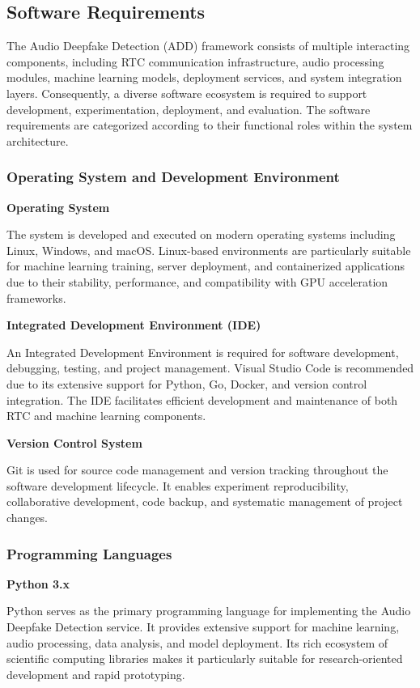 
\subsection{Software Requirements}

The Audio Deepfake Detection (ADD) framework consists of multiple interacting components, including RTC communication infrastructure, audio processing modules, machine learning models, deployment services, and system integration layers. Consequently, a diverse software ecosystem is required to support development, experimentation, deployment, and evaluation. The software requirements are categorized according to their functional roles within the system architecture.

\subsubsection{Operating System and Development Environment}
\vspace{0.5cm}
\textbf{Operating System}

The system is developed and executed on modern operating systems including Linux, Windows, and macOS. Linux-based environments are particularly suitable for machine learning training, server deployment, and containerized applications due to their stability, performance, and compatibility with GPU acceleration frameworks.

\textbf{Integrated Development Environment (IDE)}

An Integrated Development Environment is required for software development, debugging, testing, and project management. Visual Studio Code is recommended due to its extensive support for Python, Go, Docker, and version control integration. The IDE facilitates efficient development and maintenance of both RTC and machine learning components.

\textbf{Version Control System}

Git is used for source code management and version tracking throughout the software development lifecycle. It enables experiment reproducibility, collaborative development, code backup, and systematic management of project changes.


\subsubsection{Programming Languages}
\vspace{0.5cm}
\textbf{Python 3.x}

Python serves as the primary programming language for implementing the Audio Deepfake Detection service. It provides extensive support for machine learning, audio processing, data analysis, and model deployment. Its rich ecosystem of scientific computing libraries makes it particularly suitable for research-oriented development and rapid prototyping.

